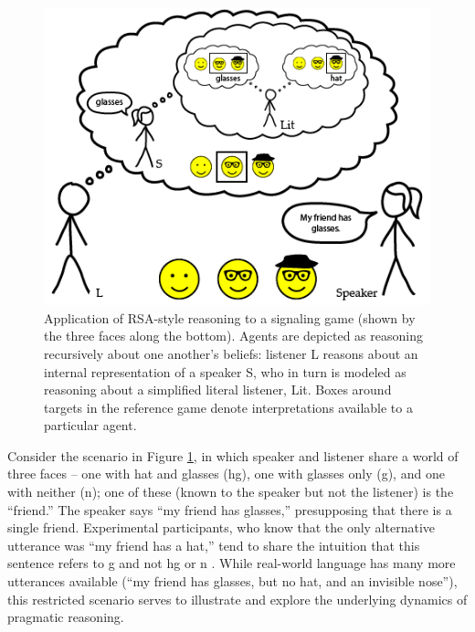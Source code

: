 \documentclass[]{elsarticle}
\begin{document}
\begin{figure}[t]
\begin{center}
\includegraphics[width=1.0\textwidth]{images/media/image02.png}
\caption{\label{fig:hg} Application of RSA-style reasoning to a signaling
game (shown by the three faces along the bottom). Agents are depicted as reasoning recursively about one another's beliefs: listener L reasons about an internal representation of a speaker S, who in turn is modeled as reasoning about a simplified literal listener, Lit. 
Boxes around targets in the reference game denote interpretations available to a particular agent.}
\end{center}
\end{figure}

Consider the scenario in Figure \ref{fig:hg}, in which speaker and listener share a
world of three faces -- one with hat and glasses ({\sc hg}), one with glasses
only ({\sc g}), and one with neither ({\sc n}); one of these (known to the speaker
but not the listener) is the ``friend.'' The speaker says ``my friend
has glasses,'' presupposing that there is a single friend. 
Experimental participants, who know that the only alternative utterance was ``my friend has a hat,'' tend to share the intuition that this sentence refers to {\sc g} and not {\sc hg} or {\sc n} \citep{stiller2011,stiller2015}. While real-world language has many more utterances available (``my friend has glasses, but no hat, and an invisible nose''), this restricted scenario serves to illustrate and explore the underlying dynamics of pragmatic reasoning.
\end{document}
